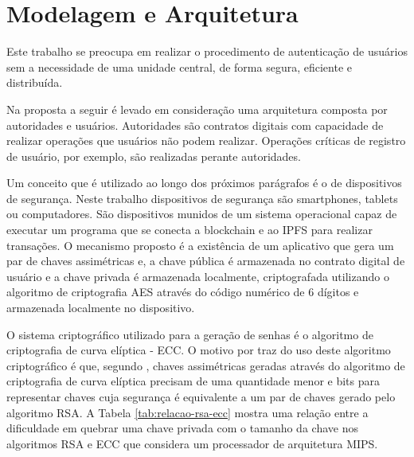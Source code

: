 \documentclass[tcc,capa]{texufpel}
\begin{document}

\chapter{Modelagem e Arquitetura}\label{chap:modelagem}

    Este trabalho se preocupa em realizar o procedimento de autenticação de usuários sem a necessidade de uma unidade central, de forma segura, eficiente e distribuída.
    
    Na proposta a seguir é levado em consideração uma arquitetura composta por autoridades e usuários. Autoridades são contratos digitais com capacidade de realizar operações que usuários não podem realizar. Operações críticas de registro de usuário, por exemplo, são realizadas perante autoridades. 
    
    Um conceito que é utilizado ao longo dos próximos parágrafos é o de dispositivos de segurança. Neste trabalho dispositivos de segurança são smartphones, tablets ou computadores. São dispositivos munidos de um sistema operacional capaz de executar um programa que se conecta a blockchain e ao IPFS para realizar transações. O mecanismo proposto é a existência de um aplicativo que gera um par de chaves assimétricas e, a chave pública é armazenada no contrato digital de usuário e a chave privada é armazenada localmente, criptografada utilizando o algoritmo de criptografia AES através do código numérico de 6 dígitos e armazenada localmente no dispositivo.
    
    O sistema criptográfico utilizado para a geração de senhas é o algoritmo de criptografia de curva elíptica - ECC. O motivo por traz do uso deste algoritmo criptográfico é que, segundo \cite{Kapoor:2008:ECC:1386853.1378356}, chaves assimétricas geradas através do algoritmo de criptografia de curva elíptica precisam de uma quantidade menor e bits para representar chaves cuja segurança é equivalente a um par de chaves gerado pelo algoritmo RSA. A Tabela \ref{tab:relacao-rsa-ecc} mostra uma relação entre a dificuldade em quebrar uma chave privada com o tamanho da chave nos algoritmos RSA e ECC que considera um processador de arquitetura MIPS.
    
\end{document}
